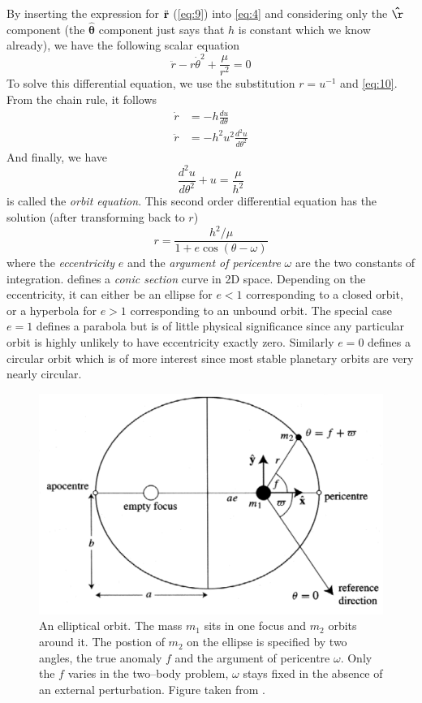 By inserting the expression for $\ddot{\boldsymbol{\mathbf{r}}}$ (\cref{eq:9}) into \cref{eq:4} 
and considering only the $\vect{\hat\r}$ component (the $\boldsymbol{\hat\theta}$
component just says that $h$ is constant which we know already), we have the following
scalar equation
\begin{equation}
\ddot{r}-r\dot{\theta}^2 + \frac{\mu}{r^2} =0
\end{equation}
To solve this differential equation, we use the substitution $r=u^{-1}$ and
\cref{eq:10}. From the chain rule, it follows
\begin{align}
    \dot{r}&=-h \frac{du}{d\theta} \\
    \ddot{r}&=-h^2u^2 \frac{d^2u}{d\theta^2} 
\end{align}
And finally, we have
\begin{equation}
    \frac{d^2u}{d\theta^2} +u= \frac{\mu}{h^2} 
    \label{eq:orbit_eq}
\end{equation}
 is called the \emph{orbit equation}. This second order 
differential equation has the solution (after transforming back to $r$)
\begin{equation}
    r = \frac{h^2/\mu}{1 + e\cos (\theta-\omega)} 
    \label{eq:orbit_eq_solution}
\end{equation}
where the \emph{eccentricity} $e$ and the \emph{argument of pericentre} $\omega$
are the two constants of integration.  defines 
a \emph{conic section} curve in 2D space. Depending on the eccentricity,
it can either be an ellipse for $e<1$ corresponding to a closed orbit, or
a hyperbola for $e>1$ corresponding to an unbound orbit. The special case
$e=1$ defines a parabola but is of little physical significance since any
particular orbit is highly unlikely to have eccentricity exactly zero. 
Similarly $e=0$ defines a circular orbit which is of more interest since
most stable planetary orbits are very nearly circular.
\begin{figure}[htb]
\centering
\includegraphics[width=\linewidth]{gfx/ellipse.png}
\caption{An elliptical orbit. The mass $m_1$ sits in one focus and $m_2$ orbits 
    around it. The postion of $m_2$ on the ellipse is specified by two angles, 
    the true anomaly $f$ and the argument of pericentre $\omega$. Only the $f$ 
    varies in the two--body problem, $\omega$ stays fixed in the absence of an
    external perturbation. Figure taken from \citeauthor{murray}.}
\label{fig:ellipse}
\end{figure}
